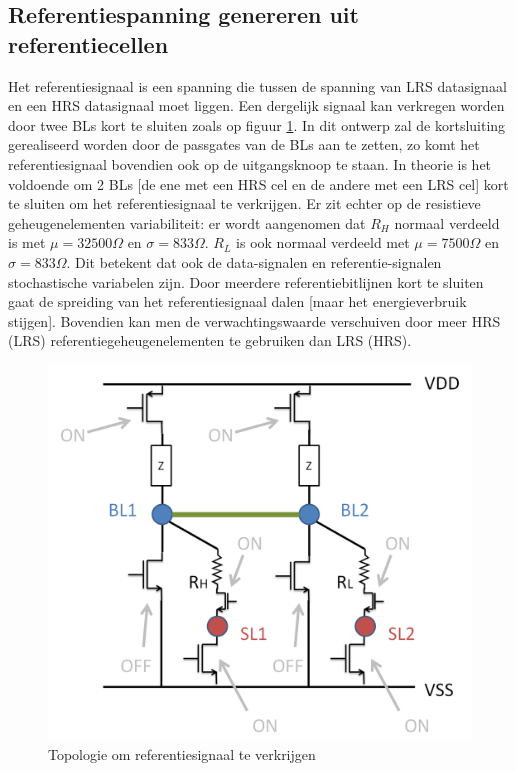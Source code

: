 \subsection{Referentiespanning genereren uit referentiecellen}
\label{refread}
Het referentiesignaal is een spanning die tussen de spanning van LRS datasignaal en een HRS datasignaal moet liggen. Een dergelijk signaal kan verkregen worden door twee BLs kort te sluiten zoals op figuur \ref{fig:2cellref}. In dit ontwerp zal de kortsluiting gerealiseerd worden door de passgates van de BLs aan te zetten, zo komt het referentiesignaal bovendien ook op de uitgangsknoop te staan. In theorie is het voldoende om 2 BLs [de ene met een HRS cel en de andere met een LRS cel] kort te sluiten om het referentiesignaal te verkrijgen. Er zit echter op de resistieve geheugenelementen variabiliteit: er wordt aangenomen dat $R_{H}$ normaal verdeeld is met $\mu = 32500\Omega$ en $\sigma = 833\Omega$. $R_{L}$ is ook normaal verdeeld met $\mu = 7500\Omega$ en $\sigma = 833\Omega$. Dit betekent dat ook de data-signalen en referentie-signalen stochastische variabelen zijn.
Door meerdere referentiebitlijnen kort te sluiten gaat de spreiding van het referentiesignaal dalen [maar het energieverbruik stijgen]. Bovendien kan men de verwachtingswaarde verschuiven door meer HRS (LRS) referentiegeheugenelementen te gebruiken dan LRS (HRS).

\begin{figure}
  \centering
  \includegraphics[scale=0.3]{../fig/hfdstk-architecture-ref2cell.png}
  \caption{Topologie om referentiesignaal te verkrijgen}
  \label{fig:2cellref}
\end{figure}

